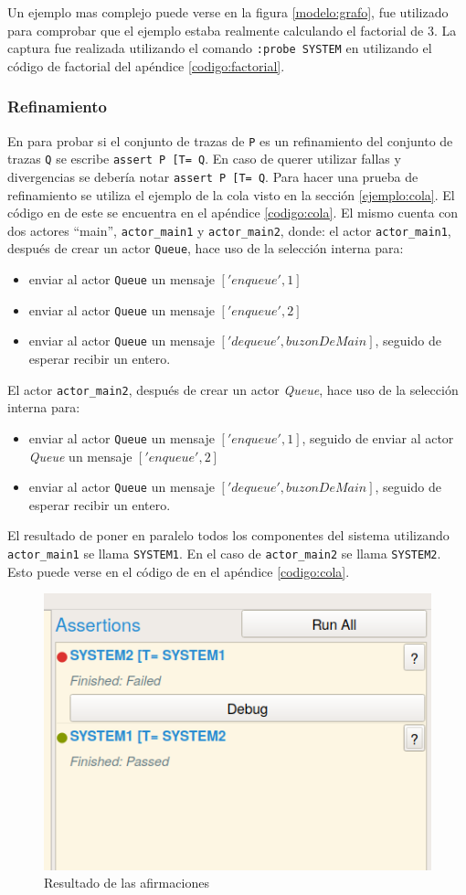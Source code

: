 Un ejemplo mas complejo puede verse en la figura \ref{modelo:grafo}, fue utilizado para comprobar que el ejemplo estaba realmente calculando el factorial de 3. La captura fue realizada utilizando el comando \verb=:probe SYSTEM= en \FDR utilizando el código de factorial del apéndice \ref{codigo:factorial}.

\subsubsection*{Refinamiento}

En \FDR para probar si el conjunto de trazas de \verb=P= es un refinamiento del conjunto de trazas \verb=Q= se escribe \verb$assert P [T= Q$. En caso de querer utilizar fallas y divergencias se debería notar \verb$assert P [T= Q$. Para hacer una prueba de refinamiento se utiliza el ejemplo de la cola visto en la sección \ref{ejemplo:cola}. El código en \CSPm de este se encuentra en el apéndice \ref{codigo:cola}. El mismo cuenta con dos actores ``main'', \verb=actor_main1= y \verb=actor_main2=, donde: el actor \verb=actor_main1=, después de crear un actor \verb=Queue=, hace uso de la selección interna para:
\begin{itemize}
 \item enviar al actor \verb=Queue= un mensaje $['enqueue', 1]$
 \item enviar al actor \verb=Queue= un mensaje $['enqueue', 2]$
 \item enviar al actor \verb=Queue= un mensaje $['dequeue', buzonDeMain]$, seguido de esperar recibir un entero.
\end{itemize}

El actor \verb=actor_main2=, después de crear un actor \textit{Queue}, hace uso de la selección interna para:
\begin{itemize}
 \item enviar al actor \verb=Queue= un mensaje $['enqueue', 1]$, seguido de enviar al actor \textit{Queue} un mensaje $['enqueue', 2]$
 \item enviar al actor \verb=Queue= un mensaje $['dequeue', buzonDeMain]$, seguido de esperar recibir un entero.
\end{itemize}

El resultado de poner en paralelo todos los componentes del sistema utilizando \verb=actor_main1= se llama \verb=SYSTEM1=. En el caso de \verb=actor_main2= se llama \verb=SYSTEM2=. Esto puede verse en el código de \CSPm en el apéndice \ref{codigo:cola}.

\begin{figure}
\begin{center}
\includegraphics[width=5 cm]{img/trazas.png}
\caption{Resultado de las afirmaciones}\label{modelo:verifica}
\end{center}
\end{figure}

